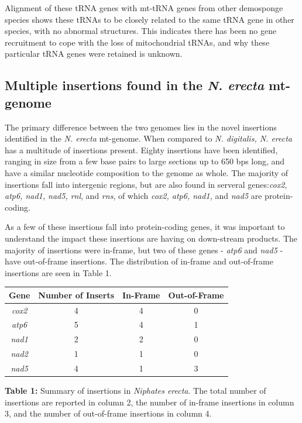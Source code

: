 \documentclass[../main.tex]{subfiles}
\begin{document}
Alignment of these tRNA genes with mt-tRNA genes from other demosponge species shows these tRNAs to be closely related to the same tRNA gene in other species, with no abnormal structures. This indicates there has been no gene recruitment to cope with the loss of mitochondrial tRNAs, and why these particular tRNA genes were retained is unknown.

\subsection{Multiple insertions found in the \emph{N. erecta} mt-genome}
The primary difference between the two genomes lies in the novel insertions identified in the \emph{N. erecta} mt-genome. When compared to \emph{N. digitalis, N. erecta} has a multitude of insertions present. Eighty insertions have been identified, ranging in size from a few base pairs to large sections up to 650 bps long, and have a similar nucleotide composition to the genome as whole. The majority of insertions fall into intergenic regions, but are also found in serveral genes:\emph{cox2, atp6, nad1, nad5, rnl}, and \emph{rns}, of which \emph{cox2, atp6, nad1,} and \emph{nad5} are protein-coding.

As a few of these insertions fall into protein-coding genes, it was important to understand the impact these insertions are having on down-stream products. The majority of insertions were in-frame, but two of these genes - \emph{atp6} and \emph{nad5} - have out-of-frame insertions. The distribution of in-frame and out-of-frame insertions are seen in Table 1.

\begin{center}
\begin{tabular}{ |c|c|c|c| } 
 \hline
 \textbf{Gene}& \textbf{Number of Inserts} & \textbf{In-Frame} & \textbf{Out-of-Frame}\\
 \hline
 \emph{cox2}  & 4  & 4 & 0 \\
\hline
\emph{atp6} & 5 & 4 & 1 \\
\hline
\emph{nad1} & 2 & 2 & 0 \\
\hline
\emph{nad2} & 1 & 1 & 0 \\
\hline
\emph{nad5} & 4 & 1 & 3 \\
\hline
\end{tabular}

\caption{\textbf{Table 1:} Summary of insertions in \emph{Niphates erecta}. The total number of insertions are reported in column 2, the number of in-frame insertions in column 3, and the number of out-of-frame insertions in column 4.}
\end{center}
\end{document}
